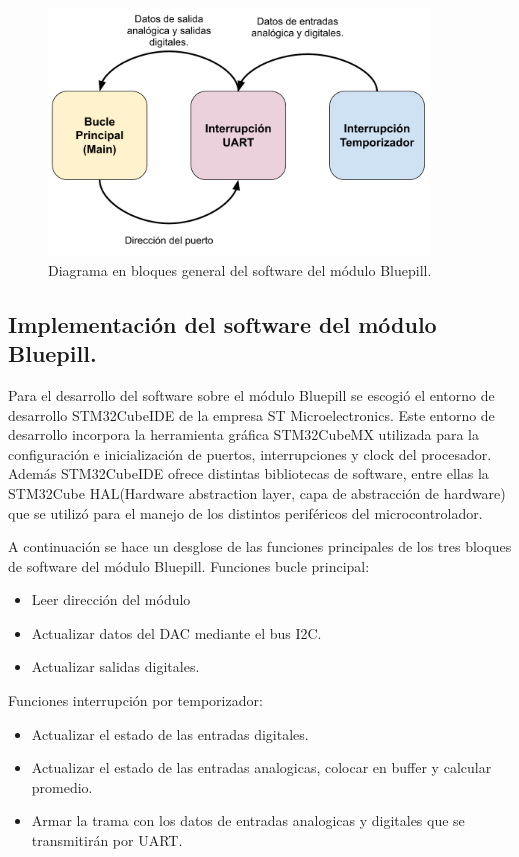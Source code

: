 \begin{figure}[H]
	\centering
	\includegraphics[width=0.9\textwidth]{./Figures/TareasSTM32.pdf}
	\caption{Diagrama en bloques general del software del módulo Bluepill.}
	\label{fig:TareasSTM32}
\end{figure}

\subsection{Implementación del software del módulo Bluepill.}
Para el desarrollo del software sobre el módulo Bluepill se escogió el entorno de desarrollo STM32CubeIDE de la empresa ST Microelectronics. Este entorno de desarrollo incorpora la herramienta gráfica STM32CubeMX utilizada para la configuración e inicialización de puertos, interrupciones y clock del procesador. Además STM32CubeIDE ofrece distintas bibliotecas de software, entre ellas la STM32Cube HAL(Hardware abstraction layer, capa de abstracción de hardware) que se utilizó para el manejo de los distintos periféricos del microcontrolador.

A continuación se hace un desglose de las funciones principales de los tres bloques de software del módulo Bluepill.
Funciones bucle principal:
\begin{itemize}
	\item Leer dirección del módulo
	\item Actualizar datos del DAC mediante el bus I2C.
	\item Actualizar salidas digitales.
\end{itemize}

Funciones interrupción por temporizador:
\begin{itemize}
	\item Actualizar el estado de las entradas digitales.
	\item Actualizar el estado de las entradas analogicas, colocar en buffer y calcular promedio.
	\item Armar la trama con los datos de entradas analogicas y digitales que se transmitirán por UART.
\end{itemize}

